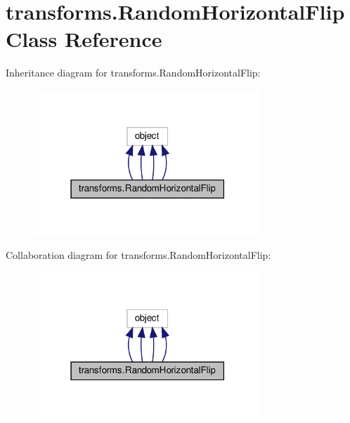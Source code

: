 \hypertarget{classtransforms_1_1RandomHorizontalFlip}{}\section{transforms.\+Random\+Horizontal\+Flip Class Reference}
\label{classtransforms_1_1RandomHorizontalFlip}


Inheritance diagram for transforms.\+Random\+Horizontal\+Flip\+:
\nopagebreak
\begin{figure}[H]
\begin{center}
\leavevmode
\includegraphics[width=243pt]{classtransforms_1_1RandomHorizontalFlip__inherit__graph}
\end{center}
\end{figure}


Collaboration diagram for transforms.\+Random\+Horizontal\+Flip\+:
\nopagebreak
\begin{figure}[H]
\begin{center}
\leavevmode
\includegraphics[width=243pt]{classtransforms_1_1RandomHorizontalFlip__coll__graph}
\end{center}
\end{figure}
